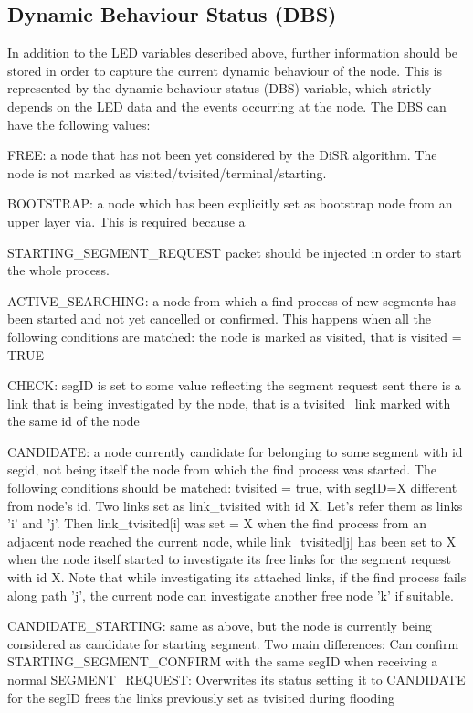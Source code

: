 \documentclass[conference]{IEEEtran}
\begin{document}
\subsection{Dynamic Behaviour Status (DBS)}
In addition to the LED variables
described above, further information should be stored in order to
capture the current dynamic behaviour of the node. This is represented
by the dynamic behaviour status (DBS) variable, which strictly depends
on the LED data and the events occurring at the node. The DBS can have
the following values:

FREE: a node that has  not been yet considered  by the DiSR algorithm.
The node is not marked as visited/tvisited/terminal/starting.

BOOTSTRAP: a node which has been explicitly set as bootstrap node from
an upper layer via. This is required because a

STARTING_SEGMENT_REQUEST packet should be injected in order to start
the whole process.

ACTIVE_SEARCHING: a node from which a find process of new segments has
been started and not yet cancelled or confirmed. This happens when all
the following conditions are matched: the node is marked as visited,
that is visited = TRUE 

CHECK: segID is set to some value reflecting
the segment request sent there is a link that is being investigated by
the node, that is a tvisited_link marked with the same id of the node 

CANDIDATE: a node currently candidate for belonging to some segment
with id segid, not being itself the node from which the find process
was started. The following conditions should be matched: tvisited =
true, with segID=X different from node's id.  Two links set as
link_tvisited with id X. Let’s refer them as  links 'i' and 'j'. Then
link_tvisited[i] was set = X when the find process from an adjacent
node reached the current node, while link_tvisited[j] has been set to
X when the node itself started to investigate its free links for the
segment request with id X. Note that while investigating its attached
links, if the find process fails along path 'j', the current node can
investigate another free node 'k' if suitable.  

CANDIDATE_STARTING:
same as above, but the node is currently being considered as candidate
for starting segment. Two main differences: Can confirm
STARTING_SEGMENT_CONFIRM with the same segID when receiving a normal
SEGMENT_REQUEST: Overwrites its status setting it to CANDIDATE for the
segID frees the links previously set as tvisited during flooding
\end{document}
